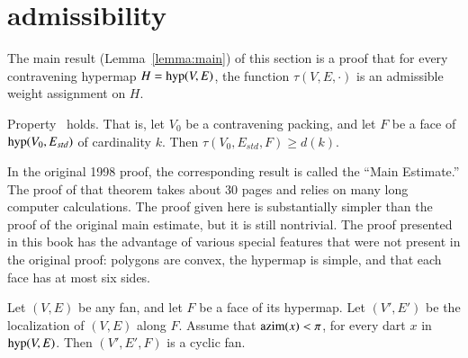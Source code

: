 \section{admissibility}




The main result (Lemma~\ref{lemma:main}) of this section is a proof that for every contravening hypermap $H={\operatorname{hyp}}(V,E)$, the function $\tau(V,E,\cdot)$
is an admissible weight assignment on $H$.



\begin{lemma}\label{lemma:main} %
Property~ holds.  That is,
let $V_0$ be a contravening packing, and  let $F$ be a
face of ${\operatorname{hyp}}(V_0,E_{std})$ of cardinality $k$.  Then
        $\tau(V_0,E_{std},F) \ge d(k)$.
\end{lemma}
%
%


\begin{remark}
In the original 1998 proof, the corresponding result
is called the ``Main Estimate.''  The proof of that 
theorem takes about 30 pages and relies on many
long computer calculations.  The proof given here
is substantially simpler than the proof of the original
main estimate, but
it is still nontrivial. The proof presented in this book has the advantage
of various special features that were not present in the original proof: 
polygons are convex, the hypermap
is simple, and that each face has at most six sides.
\end{remark}






\begin{lemma} 
Let $(V,E)$ be any fan, and let $F$ be a face of its hypermap.  Let $(V',E')$ be
the localization of $(V,E)$ along $F$.
Assume that ${\operatorname{azim}}(x)<\pi$, for every dart $x$ in ${\operatorname{hyp}}(V,E)$.
Then $(V',E',F)$ is a cyclic fan. 
\end{lemma}


